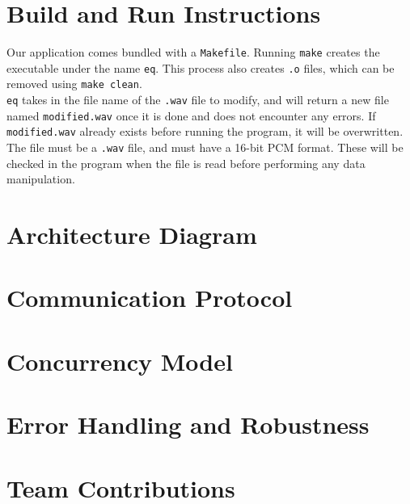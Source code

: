 \documentclass{article}
\begin{document}
\section{Build and Run Instructions}\label{build}
Our application comes bundled with a \texttt{Makefile}. Running \texttt{make} creates the executable under the name \texttt{eq}. This process also creates \texttt{.o} files, which can be removed using \texttt{make clean}.\\

\texttt{eq} takes in the file name of the \texttt{.wav} file to modify, and will return a new file named \texttt{modified.wav} once it is done and does not encounter any errors. If \texttt{modified.wav} already exists before running the program, it will be overwritten. The file must be a \texttt{.wav} file, and must have a 16-bit PCM format. These will be checked in the program when the file is read before performing any data manipulation.

\newpage
\section{Architecture Diagram}\label{arch}

\newpage
\section{Communication Protocol}\label{comm}

\section{Concurrency Model}\label{conc}

\section{Error Handling and Robustness}\label{err}

\section{Team Contributions}\label{team}
\end{document}
